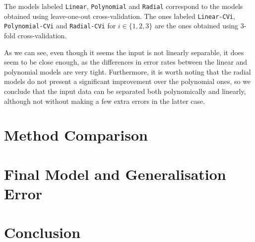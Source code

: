 \documentclass[english]{scrartcl}
\newcommand\ms[1]{\texttt{#1}}
\begin{document}
    The models labeled \ms{Linear}, \ms{Polynomial} and \ms{Radial} correspond to the models obtained using leave-one-out cross-validation. The ones labeled \ms{Linear-CVi}, \ms{Polynomial-CVi} and \ms{Radial-CVi} for $i \in \{1,2,3\}$ are the ones obtained using 3-fold cross-validation.
    
    As we can see, even though it seems the input is not linearly separable, it does seem to be close enough, as the differences in error rates between the linear and polynomial models are very tight. Furthermore, it is worth noting that the radial models do not present a significant improvement over the polynomial ones, so we conclude that the input data can be separated both polynomically and linearly, although not without making a few extra errors in the latter case.

\section{Method Comparison}

\section{Final Model and Generalisation Error}

\section{Conclusion}
\end{document}
